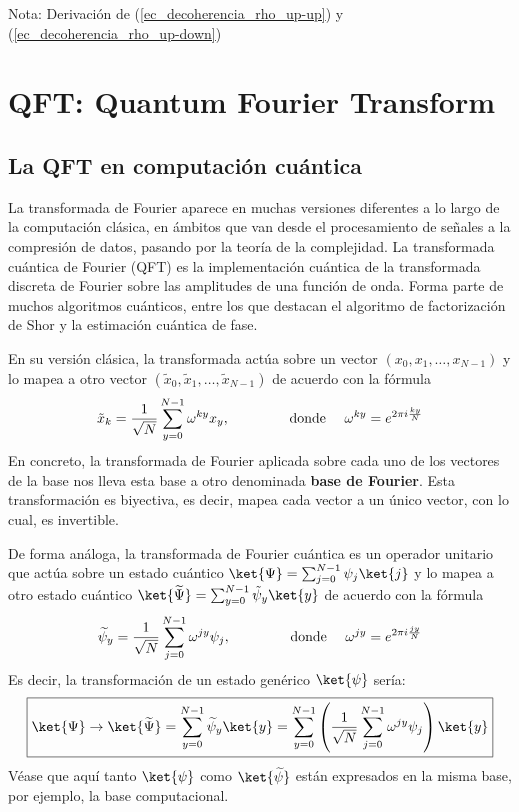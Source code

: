 \documentclass[a4paper,11pt]{book} %
\numberwithin{equation}{chapter}
\def\lp{\left(}
\def\rp{\right)}
\begin{document}
\begin{mybox_blue}{Nota: Derivación de (\ref{ec_decoherencia_rho_up-up}) y  (\ref{ec_decoherencia_rho_up-down})}
	



\chapter{QFT: Quantum Fourier Transform} \label{chapter_QFT}

	\section{La QFT en computación cuántica}
	
La transformada de Fourier aparece en muchas versiones diferentes a lo largo de la computación clásica, en ámbitos que van desde el procesamiento de señales a la compresión de datos, pasando por la teoría de la complejidad. La transformada cuántica de Fourier (QFT) es la implementación cuántica de la transformada discreta de Fourier sobre las amplitudes de una función de onda. Forma parte de muchos algoritmos cuánticos, entre los que destacan el algoritmo de factorización de Shor y la estimación cuántica de fase.

En su versión clásica, la transformada actúa sobre un vector $(x_0, x_1, \dots, x_{N-1})$ y lo mapea a otro vector $(\tilde{x}_0, \tilde{x}_1, \dots, \tilde{x}_{N-1})$ de acuerdo con la fórmula
	\begin{equation} \label{ec_QFT_clasica}
	\tilde{x}_k = \frac{1}{\sqrt{N}} \sum_{y=0}^{N-1} \omega^{ky} x_y, \hspace{1.5cm} \text{donde } \quad \omega^{ky}= e^{2\pi i \frac{ky}{N}}
	\end{equation}
 En concreto, la transformada de Fourier aplicada sobre cada uno de los vectores de la base nos lleva esta base a otro denominada \textbf{base de Fourier}. Esta transformación es biyectiva, es decir, mapea cada vector a un único vector, con lo cual, es invertible.

De forma análoga, la transformada de Fourier cuántica es un operador unitario que actúa sobre un estado cuántico $ \ket{\Psi} = \sum_{j=0}^{N-1} \psi_j \ket{j}$ y lo mapea a otro estado cuántico $\ket{\widetilde{\Psi}} = \sum_{y=0}^{N-1} \tilde{\psi}_y \ket{y}$ de acuerdo con la fórmula
	\begin{equation}
	\widetilde{\psi}_y = \frac{1}{\sqrt{N}} \sum_{j=0}^{N-1} \omega^{jy} \psi_j, \hspace{1.5cm} \text{donde } \quad \omega^{jy} = e^{2\pi i \frac{jy}{N}}
	\end{equation}
Es decir, la transformación de un estado genérico $\ket{\psi}$ sería:
	\begin{equation} \label{ec_QFT_sobre_Psi}
	\boxed{\ket{\Psi} \to \ket{\widetilde{\Psi}} = \sum_{y=0}^{N-1} \widetilde{\psi}_y \ket{y} =  \sum_{y=0}^{N-1} \lp \frac{1}{\sqrt{N}} \sum_{j=0}^{N-1} \omega^{jy} \psi_j \rp \ket{y}}
	\end{equation}	
Véase que aquí tanto $\ket{\psi}$ como $\ket{\widetilde{\psi}}$ están expresados en la misma base, por ejemplo, la base computacional.


\end{mybox_blue}
\end{document}
